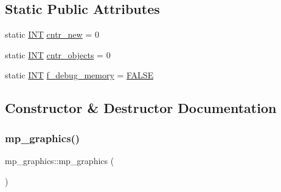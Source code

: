 \subsection*{Static Public Attributes}
\begin{DoxyCompactItemize}
\item 
static \mbox{\hyperlink{galois_8h_a09fddde158a3a20bd2dcadb609de11dc}{I\+NT}} \mbox{\hyperlink{classmp__graphics_a63a2d6002206e8499caa090b7bf7a1b6}{cntr\+\_\+new}} = 0
\item 
static \mbox{\hyperlink{galois_8h_a09fddde158a3a20bd2dcadb609de11dc}{I\+NT}} \mbox{\hyperlink{classmp__graphics_adc96ca320bdeab6d0d88395e0f382c09}{cntr\+\_\+objects}} = 0
\item 
static \mbox{\hyperlink{galois_8h_a09fddde158a3a20bd2dcadb609de11dc}{I\+NT}} \mbox{\hyperlink{classmp__graphics_a5df98a3a7314d63d49a64f7865d3b9a0}{f\+\_\+debug\+\_\+memory}} = \mbox{\hyperlink{nauty_8h_aa93f0eb578d23995850d61f7d61c55c1}{F\+A\+L\+SE}}
\end{DoxyCompactItemize}


\subsection{Constructor \& Destructor Documentation}
\mbox{\label{classmp__graphics_abe331bd484651f2b734167ff09a30858}} 
\subsubsection{\texorpdfstring{mp\+\_\+graphics()}{mp\_graphics()}\hspace{0.1cm}{\footnotesize\ttfamily [1/2]}}
{\footnotesize\ttfamily mp\+\_\+graphics\+::mp\+\_\+graphics (\begin{DoxyParamCaption}{ }\end{DoxyParamCaption})}

\mbox{\label{classmp__graphics_af6b0c5e75689ccde95031f62a98c3dbf}} 
